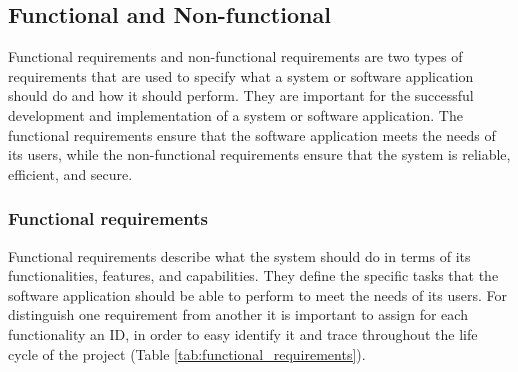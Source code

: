 \subsection{Functional and Non-functional}
Functional requirements and non-functional requirements are two types of requirements that are used
to specify what a system or software application should do and how it should perform. They are
important for the successful development and implementation of a system or software application. The
functional requirements ensure that the software application meets the needs of its users, while the
non-functional requirements ensure that the system is reliable, efficient, and secure.

\subsubsection{Functional requirements}
Functional requirements describe what the system should do in terms of its functionalities,
features, and capabilities. They define the specific tasks that the software application should be
able to perform to meet the needs of its users. For distinguish one requirement from another it is
important to assign for each functionality an ID, in order to easy identify it and trace throughout
the life cycle of the project (Table \ref{tab:functional_requirements}).

